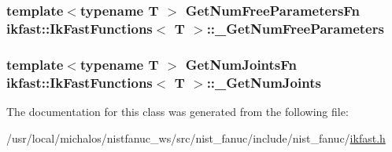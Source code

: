 \hypertarget{classikfast_1_1IkFastFunctions_ac78c6f4a428df5b34944510af3abd68f}{
\subsubsection[{\-\_\-\-Get\-Num\-Free\-Parameters}]{\setlength{\rightskip}{0pt plus 5cm}template$<$typename T $>$ {\bf Get\-Num\-Free\-Parameters\-Fn} {\bf ikfast\-::\-Ik\-Fast\-Functions}$<$ T $>$\-::\-\_\-\-Get\-Num\-Free\-Parameters}}\label{classikfast_1_1IkFastFunctions_ac78c6f4a428df5b34944510af3abd68f}
\hypertarget{classikfast_1_1IkFastFunctions_aa7aadc4d797b2ecc3811a7887b0b0dfc}{
\subsubsection[{\-\_\-\-Get\-Num\-Joints}]{\setlength{\rightskip}{0pt plus 5cm}template$<$typename T $>$ {\bf Get\-Num\-Joints\-Fn} {\bf ikfast\-::\-Ik\-Fast\-Functions}$<$ T $>$\-::\-\_\-\-Get\-Num\-Joints}}\label{classikfast_1_1IkFastFunctions_aa7aadc4d797b2ecc3811a7887b0b0dfc}


The documentation for this class was generated from the following file\-:\begin{DoxyCompactItemize}
\item 
/usr/local/michalos/nistfanuc\-\_\-ws/src/nist\-\_\-fanuc/include/nist\-\_\-fanuc/\hyperlink{ikfast_8h}{ikfast.\-h}\end{DoxyCompactItemize}
